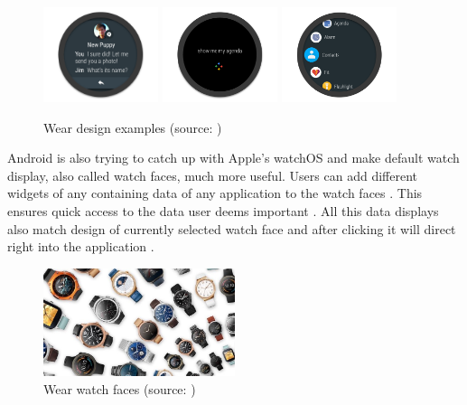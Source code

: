 \begin{figure}[H]
	\begin{centering}
		\includegraphics[width=0.3\textwidth]{img/wear_design_notification}
		\includegraphics[width=0.3\textwidth]{img/wear_design_agenda}
		\includegraphics[width=0.3\textwidth]{img/wear_design_menu}
		\par\end{centering}
	\caption{Wear design examples (source: \cite{DoAW})\label{fig:WearDesignExamples}}
	\label{fig03c04}
\end{figure}

Android is also trying to catch up with Apple's watchOS and make default watch display, also called watch faces, much more useful. Users can add different widgets of any containing data of any application to the watch faces \cite{AW2UG}. This ensures quick access to the data user deems important \cite{AW2N}. All this data displays also match design of currently selected watch face and after clicking it will direct right into the application \cite{AW2WN}.

\begin{figure}[H]
	\begin{centering}
		\includegraphics[width=0.5\textwidth]{img/wear_watch_faces}
		\par\end{centering}
	\caption{Wear watch faces (source: \cite{AW2UG})\label{fig:WearWatchFaces}}
	\label{fig04c04}
\end{figure}


